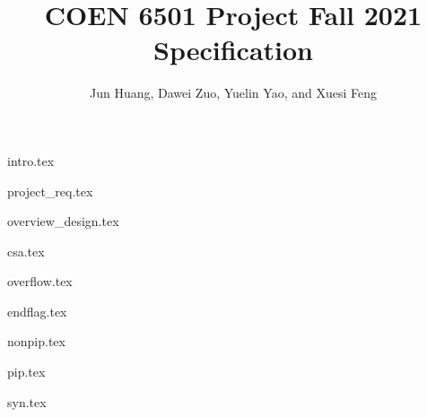 \documentclass[stu, floatsintext, 10pt, donotrepeattitle, natbib]{apa7}
\title{COEN 6501 Project Fall 2021 Specification}
\author{Jun Huang, Dawei Zuo, Yuelin Yao, and Xuesi Feng}
\begin{document}
\maketitle

\renewcommand\contentsname{Table of Conetnts}
\tableofcontents
\setcounter{tocdepth}{5}

\newpage
\renewcommand{\listfigurename}{List of Figures}
\listoffigures
\newpage
\renewcommand{\listtablename}{List of Tables}
\listoftables


\newpage
{intro.tex}

\newpage
{project_req.tex}

\newpage
{overview_design.tex}

\newpage

\newpage
{csa.tex}

\newpage
{overflow.tex}

\newpage
{endflag.tex}

\newpage
{nonpip.tex}

\newpage
{pip.tex}

\newpage
{syn.tex}

\newpage
\renewcommand\refname{\textbf{References}}

\end{document}
